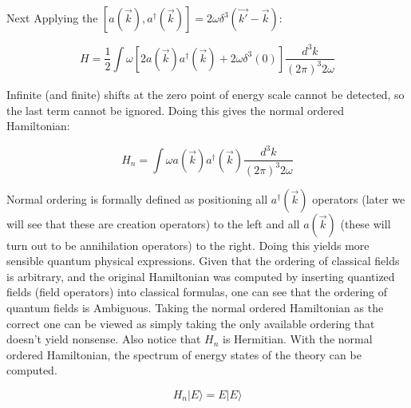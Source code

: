 \documentclass{article}
\begin{document}
    Next Applying the $[a(\vec{k}), a^{\dag}(\vec{k})] = 2 \omega \delta^{3} (\vec{k'} - \vec{k})$:

    \begin{equation}
        H = \frac{1}{2} \int \omega [2 a(\vec{k}) a^{\dag}(\vec{k}) + 2 \omega \delta^{3} (0)] \frac{d^{3} k}{(2 \pi)^{3} 2 \omega}
    \end{equation}

    Infinite (and finite) shifts at the zero point of energy scale cannot be detected,
    so the last term cannot be ignored. Doing this gives the normal ordered Hamiltonian:
    
    \begin{framed}
        \begin{equation}
            H_{n} = \int \omega a(\vec{k}) a^{\dag}(\vec{k}) \frac{d^{3} k}{(2 \pi)^{3} 2 \omega}
        \end{equation}
    \end{framed}

    Normal ordering is formally defined as positioning all $a^{\dag}(\vec{k})$ operators (later we will see that these are creation operators)
    to the left and all $a(\vec{k})$ (these will turn out to be annihilation operators) to the right. Doing this yields more sensible quantum
    physical expressions. Given that the ordering of classical fields is arbitrary, and the original Hamiltonian was computed by inserting 
    quantized fields (field operators) into classical formulas, one can see that the ordering of quantum fields is Ambiguous. Taking the normal
    ordered Hamiltonian as the correct one can be viewed as simply taking the only available ordering that doesn't yield nonsense. Also notice
    that $H_{n}$ is Hermitian. With the normal ordered Hamiltonian, the spectrum of energy states of the theory can be computed.
    
    \begin{equation}
        H_{n} | E \rangle = E | E \rangle
    \end{equation}
\end{document}
